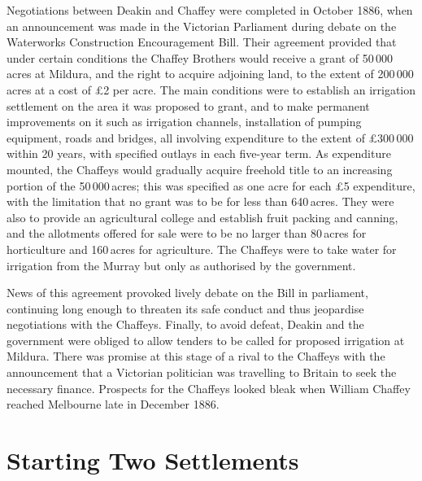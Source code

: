 Negotiations between Deakin and Chaffey were completed in October
1886, when an announcement was made in the Victorian Parliament during
debate on the Waterworks Construction Encouragement Bill.  Their
agreement provided that under certain conditions the Chaffey Brothers
would receive a grant of 50\,000\,acres at Mildura, and the right to
acquire adjoining land, to the extent of 200\,000\,acres at a cost of
\pounds2 per acre.  The main conditions were to establish an irrigation
settlement on the area it was proposed to grant, and to make permanent
improvements on it such as irrigation
channels, installation of pumping
equipment, roads and bridges, all involving expenditure to the extent
of \pounds300\,000 within 20 years, with specified outlays in each
five-year term.  As expenditure mounted, the Chaffeys would gradually
acquire freehold title to an increasing portion of the 50\,000\,acres;
this was specified as one acre for each \pounds5 expenditure, with the
limitation that no grant was to be for less than 640\,acres.  They
were also to provide an agricultural college and establish
fruit packing and canning, and the allotments offered for
sale were to be no larger than 80\,acres for horticulture and
160\,acres for agriculture. The Chaffeys were to take water for
irrigation from the Murray but only as authorised by the
government.

News of this agreement provoked lively debate on the Bill in
parliament, continuing long enough to threaten its safe conduct and
thus jeopardise negotiations with the Chaffeys.  Finally, to avoid
defeat, Dea\-kin and the government were obliged to allow tenders to
be called for proposed irrigation at Mildura.  There was promise at
this stage of a rival to the Chaffeys with the announcement that a
Victorian politician was travelling to Britain to seek
the necessary finance.  Prospects for the Chaffeys
looked bleak when William Chaffey reached Melbourne late in December
1886.

\section*{Starting Two Settlements}

